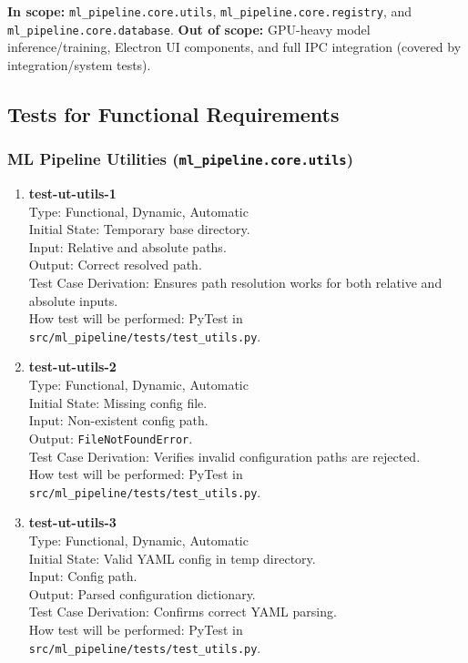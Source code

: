\documentclass[12pt, titlepage]{article}
\begin{document}
\textbf{In scope:} \texttt{ml\_pipeline.core.utils}, \texttt{ml\_pipeline.core.registry}, and \texttt{ml\_pipeline.core.database}.  
\textbf{Out of scope:} GPU-heavy model inference/training, Electron UI components, and full IPC integration (covered by integration/system tests).

\subsection{Tests for Functional Requirements}

\subsubsection{ML Pipeline Utilities (\texttt{ml\_pipeline.core.utils})}

\begin{enumerate}
\item \textbf{test-ut-utils-1}\\
Type: Functional, Dynamic, Automatic\\
Initial State: Temporary base directory.\\
Input: Relative and absolute paths.\\
Output: Correct resolved path.\\
Test Case Derivation: Ensures path resolution works for both relative and absolute inputs.\\
How test will be performed: PyTest in \texttt{src/ml\_pipeline/tests/test\_utils.py}.\\

\item \textbf{test-ut-utils-2}\\
Type: Functional, Dynamic, Automatic\\
Initial State: Missing config file.\\
Input: Non-existent config path.\\
Output: \texttt{FileNotFoundError}.\\
Test Case Derivation: Verifies invalid configuration paths are rejected.\\
How test will be performed: PyTest in \texttt{src/ml\_pipeline/tests/test\_utils.py}.\\

\item \textbf{test-ut-utils-3}\\
Type: Functional, Dynamic, Automatic\\
Initial State: Valid YAML config in temp directory.\\
Input: Config path.\\
Output: Parsed configuration dictionary.\\
Test Case Derivation: Confirms correct YAML parsing.\\
How test will be performed: PyTest in \texttt{src/ml\_pipeline/tests/test\_utils.py}.\\


\end{enumerate}
\end{document}
